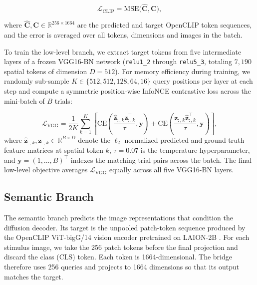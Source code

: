 \begin{equation}
\mathcal{L}_{\mathrm{CLIP}} = \mathrm{MSE}\big(\hat{\mathbf{C}}, \mathbf{C}\big),
\end{equation}

\medskip

where $\hat{\mathbf{C}}, \mathbf{C} \in \mathbb{R}^{256 \times 1664}$ are the predicted and target OpenCLIP token sequences, and the error is averaged over all tokens, dimensions and images in the batch.

To train the low-level branch, we extract target tokens from five intermediate layers of a frozen VGG16-BN network (\texttt{relu1\_2} through \texttt{relu5\_3}, totaling $7{,}190$ spatial tokens of dimension $D=512$). For memory efficiency during training, we randomly sub-sample $K\in \{512, 512, 128, 64, 16\}$ query positions per layer at each step and compute a symmetric position-wise InfoNCE contrastive loss across the mini-batch of $B$ trials:

\begin{equation}
\mathcal{L}_{\mathrm{VGG}} =
\frac{1}{2K}\sum_{k=1}^{K}\left[\mathrm{CE}\!\left({\scriptstyle
\frac{\hat{\mathbf{z}}_{:,k}\mathbf{z}_{:,k}^{\top}}{\tau}},
\mathbf{y}\right) + \mathrm{CE}\!\left({\scriptstyle \frac{\mathbf{z}_{:,
k}\hat{\mathbf{z}}_{:,k}^{\top}}{\tau}}, \mathbf{y}\right)\right],
\end{equation}
where $\hat{\mathbf{z}}_{:,k}, \mathbf{z}_{:,k} \in \mathbb{R}^{B \times
D}$ denote the $\ell_2$-normalized predicted and ground-truth feature
matrices at spatial token $k$, $\tau = 0.07$ is the temperature
hyperparameter, and $\mathbf{y} = (1, \dots, B)^{\top}$ indexes the
matching trial pairs across the batch. The final low-level objective
averages $\mathcal{L}_{\mathrm{VGG}}$ equally across all five VGG16-BN layers.

\subsection{Semantic Branch}
The semantic branch predicts the image representations that condition the diffusion decoder. Its target is the unpooled patch-token sequence produced by the OpenCLIP ViT-bigG/14 vision encoder pretrained on LAION-2B \cite{schuhmann2022laionb}. For each stimulus image, we take the 256 patch tokens before the final projection and discard the class (CLS) token. Each token is 1664-dimensional. The bridge therefore uses 256 queries and projects to 1664 dimensions so that its output matches the target.

